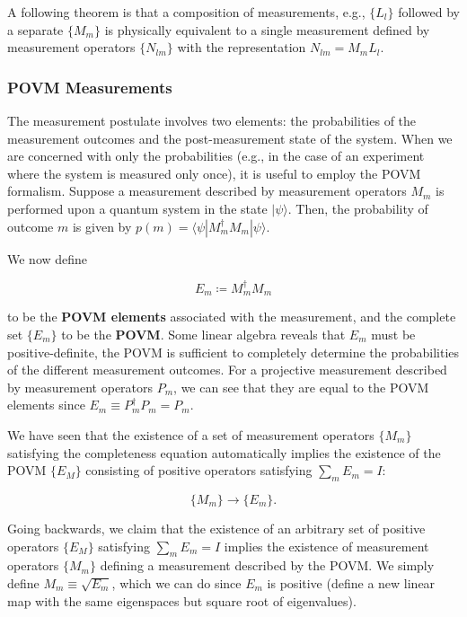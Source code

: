 \documentclass{article}
\begin{document}
    \begin{theorem}
    A following theorem is that a composition of measurements, e.g., $\{L_l\}$ followed by a separate $\{M_m\}$ is physically equivalent to a single measurement defined by measurement operators $\{N_{lm}\}$ with the representation $N_{lm} = M_m L_l$.  
    \end{theorem}

    \subsubsection{POVM Measurements}

      The measurement postulate involves two elements: the probabilities of the measurement outcomes and the post-measurement state of the system. When we are concerned with only the probabilities (e.g., in the case of an experiment where the system is measured only once), it is useful to employ the POVM formalism. Suppose a measurement described by measurement operators $M_m$ is performed upon a quantum system in the state $|\psi\rangle$. Then, the probability of outcome $m$ is given by $p(m) = \langle \psi | M_m^\dagger M_m | \psi \rangle$. 

      We now define

        \[E_m \coloneqq M_m^\dagger M_m\]

      to be the \textbf{POVM elements} associated with the measurement, and the complete set $\{E_m\}$ to be the \textbf{POVM}. Some linear algebra reveals that $E_m$ must be positive-definite, the POVM is sufficient to completely determine the probabilities of the different measurement outcomes. For a projective measurement described by measurement operators $P_m$, we can see that they are equal to the POVM elements since $E_m \equiv P_m^\dagger P_m = P_m$.

      We have seen that the existence of a set of measurement operators $\{M_m\}$ satisfying the completeness equation automatically implies the existence of the POVM $\{E_M\}$ consisting of positive operators satisfying $\sum_m E_m = I$:

        \[\{M_m\} \longrightarrow \{E_m\}.\]

      Going backwards, we claim that the existence of an arbitrary set of positive operators $\{E_M\}$ satisfying $\sum_m E_m = I$ implies the existence of measurement operators $\{M_m\}$ defining a measurement described by the POVM. We simply define $M_m \equiv \sqrt{E_m}$, which we can do since $E_m$ is positive (define a new linear map with the same eigenspaces but square root of eigenvalues).
\end{document}
